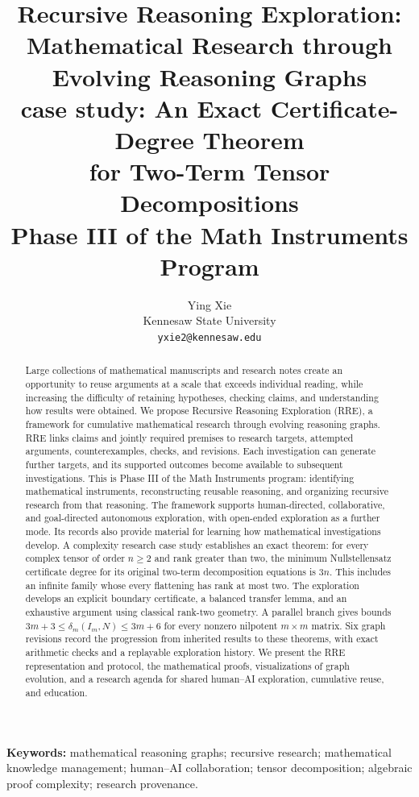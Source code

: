 \documentclass[11pt]{article}
\title{Recursive Reasoning Exploration:\\Mathematical Research through\\Evolving Reasoning Graphs\\[0.6em]\large case study: An Exact Certificate-Degree Theorem\\for Two-Term Tensor Decompositions\\[0.45em]\normalsize Phase III of the Math Instruments Program}
\author{Ying Xie\\Kennesaw State University\\\texttt{yxie2@kennesaw.edu}}
\date{}
\theoremstyle{definition}
\theoremstyle{remark}
\begin{document}
\maketitle

\begin{abstract}

Large collections of mathematical manuscripts and research notes create an opportunity to reuse arguments at a scale that exceeds individual reading, while increasing the difficulty of retaining hypotheses, checking claims, and understanding how results were obtained. We propose Recursive Reasoning Exploration (RRE), a framework for cumulative mathematical research through evolving reasoning graphs. RRE links claims and jointly required premises to research targets, attempted arguments, counterexamples, checks, and revisions. Each investigation can generate further targets, and its supported outcomes become available to subsequent investigations. This is Phase III of the Math Instruments program: identifying mathematical instruments, reconstructing reusable reasoning, and organizing recursive research from that reasoning. The framework supports human-directed, collaborative, and goal-directed autonomous exploration, with open-ended exploration as a further mode. Its records also provide material for learning how mathematical investigations develop. A complexity research case study establishes an exact theorem: for every complex tensor of order $n\ge2$ and rank greater than two, the minimum Nullstellensatz certificate degree for its original two-term decomposition equations is $3n$. This includes an infinite family whose every flattening has rank at most two. The exploration develops an explicit boundary certificate, a balanced transfer lemma, and an exhaustive argument using classical rank-two geometry. A parallel branch gives bounds $3m+3\le\delta_m(I_m,N)\le3m+6$ for every nonzero nilpotent $m\times m$ matrix. Six graph revisions record the progression from inherited results to these theorems, with exact arithmetic checks and a replayable exploration history. We present the RRE representation and protocol, the mathematical proofs, visualizations of graph evolution, and a research agenda for shared human--AI exploration, cumulative reuse, and education.

\end{abstract}

\noindent\textbf{Keywords:} mathematical reasoning graphs; recursive research; mathematical knowledge management; human--AI collaboration; tensor decomposition; algebraic proof complexity; research provenance.
\end{document}
